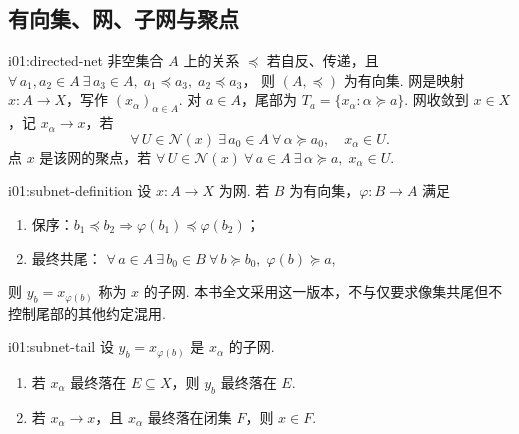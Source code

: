 \subsection{有向集、网、子网与聚点}

\begin{FADefinition}[C][有向集与网]{i01:directed-net}
非空集合 \(\displaystyle A\) 上的关系 \(\displaystyle \preceq\) 若自反、传递，且 \(\displaystyle \forall\,a_1,a_2\in A\ \exists\,a_3\in A, \; a_1\preceq a_3, \; a_2\preceq a_3\)，
则 \(\displaystyle (A,\preceq)\) 为有向集. 网是映射 \(\displaystyle x:A\to X\)，写作 \(\displaystyle (x_\alpha)_{\alpha\in A}\). 对 \(\displaystyle a\in A\)，尾部为 \(\displaystyle T_a=\{x_\alpha:\alpha\succeq a\}\).
网收敛到 \(\displaystyle x\in X\)，记 \(\displaystyle x_\alpha\to x\)，若
\[
\forall\,U\in\mathcal N(x)\ \exists\,a_0\in A\ \forall\,\alpha\succeq a_0,
\quad x_\alpha\in U.
\]
点 \(\displaystyle x\) 是该网的聚点，若 \(\displaystyle \forall\,U\in\mathcal N(x)\ \forall\,a\in A\ \exists\,\alpha\succeq a, \; x_\alpha\in U\).
\end{FADefinition}

\begin{FADefinition}[C][子网：单调且最终共尾版本]{i01:subnet-definition}
设 \(\displaystyle x:A\to X\) 为网. 若 \(\displaystyle B\) 为有向集，\(\displaystyle \varphi:B\to A\) 满足
\begin{enumerate}[label=\textup{(\roman*)}]
\item 保序：\(\displaystyle b_1\preceq b_2\Rightarrow\varphi(b_1)\preceq\varphi(b_2)\)；
\item 最终共尾： \(\displaystyle \forall\,a\in A\ \exists\,b_0\in B\ \forall\,b\succeq b_0, \; \varphi(b)\succeq a\),
\end{enumerate}
则 \(\displaystyle y_b=x_{\varphi(b)}\) 称为 \(\displaystyle x\) 的子网. 本书全文采用这一版本，不与仅要求像集共尾但不控制尾部的其他约定混用.
\end{FADefinition}

\begin{FAProposition}[C][子网的尾部继承]{i01:subnet-tail}
设 \(\displaystyle y_b=x_{\varphi(b)}\) 是 \(\displaystyle x_\alpha\) 的子网.
\begin{enumerate}[label=\textup{(\roman*)}]
\item 若 \(\displaystyle x_\alpha\) 最终落在 \(\displaystyle E\subseteq X\)，则 \(\displaystyle y_b\) 最终落在 \(\displaystyle E\).
\item 若 \(\displaystyle x_\alpha\to x\)，且 \(\displaystyle x_\alpha\) 最终落在闭集 \(\displaystyle F\)，则 \(\displaystyle x\in F\).
\end{enumerate}
\end{FAProposition}

